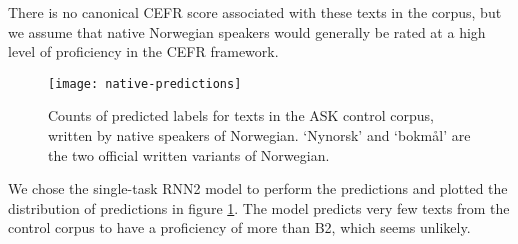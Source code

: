 There is no canonical CEFR score associated with
these texts in the corpus, but we assume that native Norwegian speakers would
generally be rated at a high level of proficiency in the CEFR framework.

\begin{figure}
  \centering
  \texttt{[image: native-predictions]}
  \caption[Predicted CEFR score for native Norwegian speakers]{
    Counts of predicted labels for texts in the ASK control corpus, written by
    native speakers of Norwegian. `Nynorsk' and `bokmål' are the two official
    written variants of Norwegian.
  }
  \label{native-predictions}
\end{figure}

We chose the single-task RNN2 model to perform the predictions and plotted the
distribution of predictions in figure \ref{native-predictions}. The model predicts
very few texts from the control corpus to have a proficiency of more than B2,
which seems unlikely.
